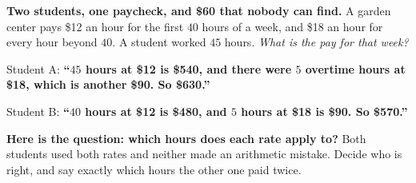 \documentclass[10pt]{article}
\begin{document}
\boxguard[12]
\begin{hookbox}
\small
\textbf{Two students, one paycheck, and \$60 that nobody can find.} A garden center pays \$12 an hour
for the first $40$ hours of a week, and \$18 an hour for every hour beyond $40$. A student worked
$45$ hours. \emph{What is the pay for that week?}

\smallskip
Student A: \textbf{``$45$ hours at \$12 is \$540, and there were $5$ overtime hours at \$18, which is
another \$90. So \$630.''}

\smallskip
Student B: \textbf{``$40$ hours at \$12 is \$480, and $5$ hours at \$18 is \$90. So \$570.''}

\smallskip
\textbf{Here is the question: which hours does each rate apply to?} Both students used both rates and
neither made an arithmetic mistake. Decide who is right, and say exactly which hours the other one
paid twice.

\end{hookbox}

\vspace{0.10in}
\end{document}
